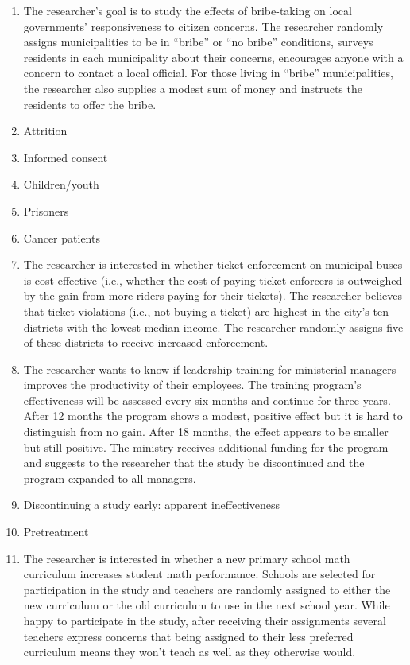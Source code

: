 \documentclass[12pt,a4]{article}
\begin{document}
\begin{enumerate}
\item The researcher's goal is to study the effects of bribe-taking on local governments' responsiveness to citizen concerns. The researcher randomly assigns municipalities to be in ``bribe'' or ``no bribe'' conditions, surveys residents in each municipality about their concerns, encourages anyone with a concern to contact a local official. For those living in ``bribe'' municipalities, the researcher also supplies a modest sum of money and instructs the residents to offer the bribe.

\item Attrition

\item Informed consent

\item Children/youth

\item Prisoners

\item Cancer patients

\item The researcher is interested in whether ticket enforcement on municipal buses is cost effective (i.e., whether the cost of paying ticket enforcers is outweighed by the gain from more riders paying for their tickets). The researcher believes that ticket violations (i.e., not buying a ticket) are highest in the city's ten districts with the lowest median income. The researcher randomly assigns five of these districts to receive increased enforcement. %

\item The researcher wants to know if leadership training for ministerial managers improves the productivity of their employees. The training program's effectiveness will be assessed every six months and continue for three years. After 12 months the program shows a modest, positive effect but it is hard to distinguish from no gain. After 18 months, the effect appears to be smaller but still positive. The ministry receives additional funding for the program and suggests to the researcher that the study be discontinued and the program expanded to all managers.

\item Discontinuing a study early: apparent ineffectiveness

\item Pretreatment

\item The researcher is interested in whether a new primary school math curriculum increases student math performance. Schools are selected for participation in the study and teachers are randomly assigned to either the new curriculum or the old curriculum to use in the next school year. While happy to participate in the study, after receiving their assignments several teachers express concerns that being assigned to their less preferred curriculum means they won't teach as well as they otherwise would. %


\end{enumerate}
\end{document}
